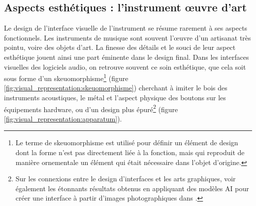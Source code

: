 \subsection{Aspects esthétiques : l'instrument œuvre d'art}

\noindent Le design de l'interface visuelle de l'instrument se résume rarement à ses aspects fonctionnels. Les instruments de musique sont souvent l'œuvre d'un artisanat très pointu, voire des objets d'art. La finesse des détails et le souci de leur aspect esthétique jouent ainsi une part éminente dans le design final. Dans les interfaces visuelles des logiciels audio, on retrouve souvent ce soin esthétique, que cela soit sous forme d'un skeuomorphisme\footnote{Le terme de skeuomorphisme est utilisé pour définir un élément de design dont la forme n'est pas directement liée à la fonction, mais qui reproduit de manière ornementale un élément qui était nécessaire dans l'objet d'origine.} (figure \ref{fig:visual_representation:skeuomorphisme}) cherchant à imiter le bois des instruments acoustiques, le métal et l'aspect physique des boutons sur les équipements hardware, ou d'un design plus épuré\footnote{Sur les connexions entre le design d'interfaces et les arts graphiques, voir également les étonnants résultats obtenus en appliquant des modèles AI pour créer une interface à partir d'images photographiques dans \cite{troyer_mondrian_2019}.}  (figure \ref{fig:visual_representation:apparatum}).

